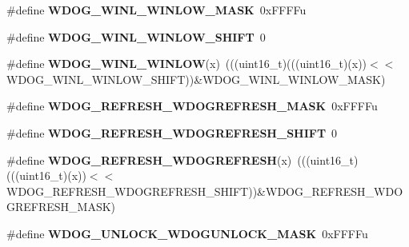 \begin{DoxyCompactItemize}
\item 
\#define {\bfseries W\+D\+O\+G\+\_\+\+W\+I\+N\+L\+\_\+\+W\+I\+N\+L\+O\+W\+\_\+\+M\+A\+SK}~0x\+F\+F\+F\+Fu\hypertarget{group__WDOG__Register__Masks_gadc36bfdccd5e9c14d063a5b36b6a3f6a}{}\label{group__WDOG__Register__Masks_gadc36bfdccd5e9c14d063a5b36b6a3f6a}

\item 
\#define {\bfseries W\+D\+O\+G\+\_\+\+W\+I\+N\+L\+\_\+\+W\+I\+N\+L\+O\+W\+\_\+\+S\+H\+I\+FT}~0\hypertarget{group__WDOG__Register__Masks_ga7f2baf848e4bfe9b0143d073467d1c1a}{}\label{group__WDOG__Register__Masks_ga7f2baf848e4bfe9b0143d073467d1c1a}

\item 
\#define {\bfseries W\+D\+O\+G\+\_\+\+W\+I\+N\+L\+\_\+\+W\+I\+N\+L\+OW}(x)~(((uint16\+\_\+t)(((uint16\+\_\+t)(x))$<$$<$W\+D\+O\+G\+\_\+\+W\+I\+N\+L\+\_\+\+W\+I\+N\+L\+O\+W\+\_\+\+S\+H\+I\+FT))\&W\+D\+O\+G\+\_\+\+W\+I\+N\+L\+\_\+\+W\+I\+N\+L\+O\+W\+\_\+\+M\+A\+SK)\hypertarget{group__WDOG__Register__Masks_gab55f3f4203f758c69ed8ab7e41db69fd}{}\label{group__WDOG__Register__Masks_gab55f3f4203f758c69ed8ab7e41db69fd}

\item 
\#define {\bfseries W\+D\+O\+G\+\_\+\+R\+E\+F\+R\+E\+S\+H\+\_\+\+W\+D\+O\+G\+R\+E\+F\+R\+E\+S\+H\+\_\+\+M\+A\+SK}~0x\+F\+F\+F\+Fu\hypertarget{group__WDOG__Register__Masks_ga59e560838a4c519b514c0def0d6034fa}{}\label{group__WDOG__Register__Masks_ga59e560838a4c519b514c0def0d6034fa}

\item 
\#define {\bfseries W\+D\+O\+G\+\_\+\+R\+E\+F\+R\+E\+S\+H\+\_\+\+W\+D\+O\+G\+R\+E\+F\+R\+E\+S\+H\+\_\+\+S\+H\+I\+FT}~0\hypertarget{group__WDOG__Register__Masks_ga526acc27150ff67f1f026bdcc1bb364c}{}\label{group__WDOG__Register__Masks_ga526acc27150ff67f1f026bdcc1bb364c}

\item 
\#define {\bfseries W\+D\+O\+G\+\_\+\+R\+E\+F\+R\+E\+S\+H\+\_\+\+W\+D\+O\+G\+R\+E\+F\+R\+E\+SH}(x)~(((uint16\+\_\+t)(((uint16\+\_\+t)(x))$<$$<$W\+D\+O\+G\+\_\+\+R\+E\+F\+R\+E\+S\+H\+\_\+\+W\+D\+O\+G\+R\+E\+F\+R\+E\+S\+H\+\_\+\+S\+H\+I\+FT))\&W\+D\+O\+G\+\_\+\+R\+E\+F\+R\+E\+S\+H\+\_\+\+W\+D\+O\+G\+R\+E\+F\+R\+E\+S\+H\+\_\+\+M\+A\+SK)\hypertarget{group__WDOG__Register__Masks_ga08d4fbad4e65e50bf94e1fbf5f48e065}{}\label{group__WDOG__Register__Masks_ga08d4fbad4e65e50bf94e1fbf5f48e065}

\item 
\#define {\bfseries W\+D\+O\+G\+\_\+\+U\+N\+L\+O\+C\+K\+\_\+\+W\+D\+O\+G\+U\+N\+L\+O\+C\+K\+\_\+\+M\+A\+SK}~0x\+F\+F\+F\+Fu\hypertarget{group__WDOG__Register__Masks_gadcf9026f6f2730a765e504ec4c7126a8}{}\label{group__WDOG__Register__Masks_gadcf9026f6f2730a765e504ec4c7126a8}


\end{DoxyCompactItemize}
